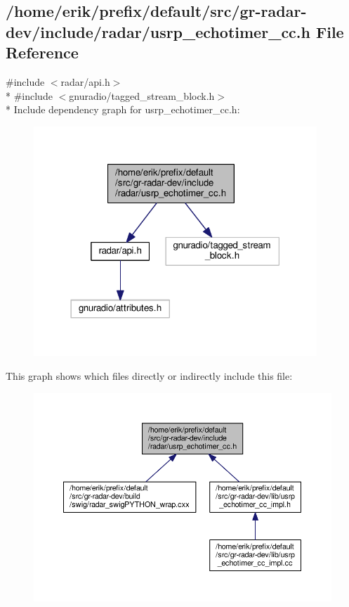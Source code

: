 \subsection{/home/erik/prefix/default/src/gr-\/radar-\/dev/include/radar/usrp\+\_\+echotimer\+\_\+cc.h File Reference}
\label{usrp__echotimer__cc_8h}
{\ttfamily \#include $<$radar/api.\+h$>$}\\*
{\ttfamily \#include $<$gnuradio/tagged\+\_\+stream\+\_\+block.\+h$>$}\\*
Include dependency graph for usrp\+\_\+echotimer\+\_\+cc.\+h\+:
\nopagebreak
\begin{figure}[H]
\begin{center}
\leavevmode
\includegraphics[width=302pt]{dd/d98/usrp__echotimer__cc_8h__incl}
\end{center}
\end{figure}
This graph shows which files directly or indirectly include this file\+:
\nopagebreak
\begin{figure}[H]
\begin{center}
\leavevmode
\includegraphics[width=350pt]{d3/dbe/usrp__echotimer__cc_8h__dep__incl}
\end{center}
\end{figure}
